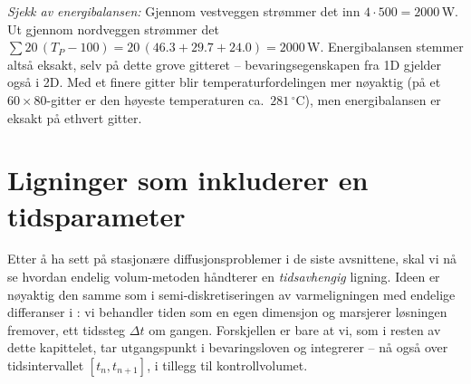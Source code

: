 \emph{Sjekk av energibalansen:} Gjennom vestveggen strømmer det inn $4\cdot 500 = 2000\,$W. Ut gjennom nordveggen strømmer det $\sum 20\,(T_P - 100) = 20\,(46.3+29.7+24.0) = 2000\,$W. Energibalansen stemmer altså eksakt, selv på dette grove gitteret -- bevaringsegenskapen fra 1D gjelder også i 2D. Med et finere gitter blir temperaturfordelingen mer nøyaktig (på et $60\times 80$-gitter er den høyeste temperaturen ca.\ $281\,^\circ$C), men energibalansen er eksakt på ethvert gitter.

\section{Ligninger som inkluderer en tidsparameter}\label{sect:EVM_tid}

Etter å ha sett på stasjonære diffusjonsproblemer i de siste avsnittene, skal vi nå se hvordan endelig volum-metoden håndterer en \emph{tidsavhengig} ligning. Ideen er nøyaktig den samme som i semi-diskretiseringen av varmeligningen med endelige differanser i : vi behandler tiden som en egen dimensjon og marsjerer løsningen fremover, ett tidssteg $\Delta t$ om gangen. Forskjellen er bare at vi, som i resten av dette kapittelet, tar utgangspunkt i bevaringsloven og integrerer -- nå også over tidsintervallet $[t_n,t_{n+1}]$, i tillegg til kontrollvolumet.

